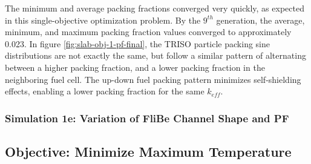 The minimum and average packing fractions converged very quickly, as expected 
in this single-objective optimization problem.
By the $9^{th}$ generation, the average, minimum, and maximum packing fraction
values converged to approximately 0.023. 
In figure \ref{fig:slab-obj-1-pf-final}, the TRISO particle packing 
sine distributions are not exactly the same, but follow a similar pattern of 
alternating between a higher packing fraction, and a lower packing fraction 
in the neighboring fuel cell. 
The up-down fuel packing pattern minimizes self-shielding effects, enabling  
a lower packing fraction for the same $k_{eff}$. 

\subsubsection{Simulation 1e: Variation of FliBe Channel Shape and PF}

\subsection{Objective: Minimize Maximum Temperature}

